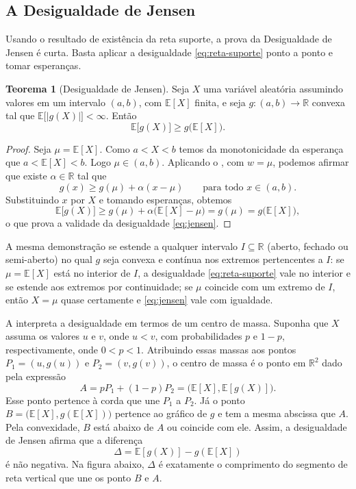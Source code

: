 \documentclass[12pt,portuguese]{article}
\theoremstyle{definition}
\newtheorem{theorem}{Teorema}
\theoremstyle{plainexercise}
\theoremstyle{starredexercise}
\theoremstyle{definition}
\begin{document}
\subsection{A Desigualdade de Jensen}\label{subsec:jensen}

Usando o resultado de existência da reta suporte, 
a prova da Desigualdade de Jensen é curta. Basta aplicar a desigualdade
\eqref{eq:reta-suporte} ponto a ponto e tomar esperanças.

\begin{theorem}[Desigualdade de Jensen]\label{thm:jensen}
Seja $X$ uma variável aleatória assumindo valores em um intervalo
$(a,b)$, com $\mathbb{E}[X]$ finita, e seja $g\colon(a,b)\to\mathbb{R}$
convexa tal que $\mathbb{E}\bigl[|g(X)|\bigr]<\infty$. Então
\begin{equation}\label{eq:jensen}
\mathbb{E}\bigl[g(X)\bigr]\geqslant g\bigl(\mathbb{E}[X]\bigr).
\end{equation}
\end{theorem}

\begin{proof}
Seja $\mu=\mathbb{E}[X]$. Como $a< X< b$ temos da monotonicidade da esperança 
que $a< \mathbb{E}[X] < b$. Logo $\mu\in (a,b)$. Aplicando o 
, com $w=\mu$, podemos afirmar que existe $\alpha\in\mathbb{R}$ tal
que
\[
g(x)\geqslant g(\mu)+\alpha(x-\mu)
\qquad
\text{para todo }x\in(a,b).
\]
Substituindo $x$ por $X$ e tomando esperanças, obtemos
\[
\mathbb{E}\bigl[g(X)\bigr]
\geqslant
g(\mu)+\alpha\bigl(\mathbb{E}[X]-\mu\bigr)
=
g(\mu) = g\bigl(\mathbb{E}[X]\bigr),
\]
o que prova a validade da desigualdade \eqref{eq:jensen}.
\end{proof}

A mesma demonstração se estende a qualquer intervalo $I\subseteq\mathbb{R}$
(aberto, fechado ou semi-aberto) no qual $g$ seja convexa e contínua nos
extremos pertencentes a $I$: se $\mu=\mathbb{E}[X]$ está no interior de $I$, a
desigualdade \eqref{eq:reta-suporte} vale no interior e se estende aos
extremos por continuidade; se $\mu$ coincide com um extremo de $I$, então
$X=\mu$ quase certamente e \eqref{eq:jensen} vale com igualdade.

A  interpreta a desigualdade em termos de um
centro de massa. Suponha que $X$ assuma os valores $u$ e $v$, onde $u<v$, 
com probabilidades $p$ e $1-p$, respectivamente, onde $0<p<1$. Atribuindo essas massas aos
pontos $P_1=(u,g(u))$ e $P_2=(v,g(v))$, o centro de massa é
o ponto em $\mathbb{R}^2$ dado pela expressão
\[
A=pP_1+(1-p)P_2
 =\bigl(\mathbb{E}[X],\mathbb{E}[g(X)]\bigr).
\]
Esse ponto pertence à corda que une $P_1$ a $P_2$. Já o ponto
$B=\bigl(\mathbb{E}[X],g(\mathbb{E}[X])\bigr)$ pertence ao gráfico de $g$
e tem a mesma abscissa que $A$. Pela convexidade, $B$ está abaixo de $A$
ou coincide com ele. Assim, a desigualdade de Jensen afirma que a
diferença
\[
\Delta=\mathbb{E}[g(X)]-g(\mathbb{E}[X])
\]
é não negativa. Na figura abaixo, $\Delta$ é exatamente o comprimento do segmento de reta vertical
que une os ponto $B$ e $A$.
\end{document}
